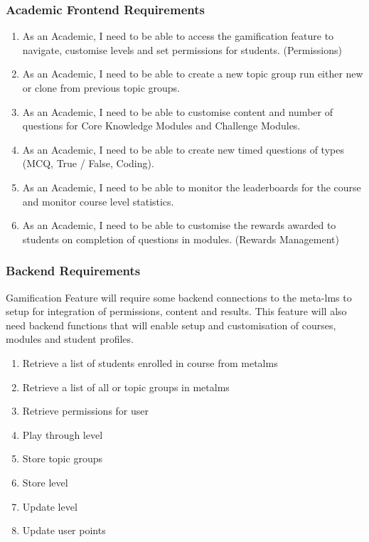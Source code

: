 \subsubsection{Academic Frontend Requirements}
\begin{enumerate}
    \item As an Academic, I need to be able to access the gamification feature to navigate, customise levels and set permissions for students. (Permissions)
    \item As an Academic, I need to be able to create a new topic group run either new or clone from previous topic groups.
    \item As an Academic, I need to be able to customise content and number of questions for Core Knowledge Modules and Challenge Modules.
    \item As an Academic, I need to be able to create new timed questions of types (MCQ, True / False, Coding).
    \item As an Academic, I need to be able to monitor the leaderboards for the course and monitor course level statistics.
    \item As an Academic, I need to be able to customise the rewards awarded to students on completion of questions in modules. (Rewards Management)
\end{enumerate}

\newpage

\subsubsection{Backend Requirements}
Gamification Feature will require some backend connections to the meta-lms to setup for integration of permissions, content and results.
This feature will also need backend functions that will enable setup and customisation of courses, modules and student profiles.

\begin{enumerate}
    \item Retrieve a list of students enrolled in course from metalms
    \item Retrieve a list of all or topic groups in metalms
    \item Retrieve permissions for user
    \item Play through level
    \item Store topic groups
    \item Store level
    \item Update level
    \item Update user points
\end{enumerate}

